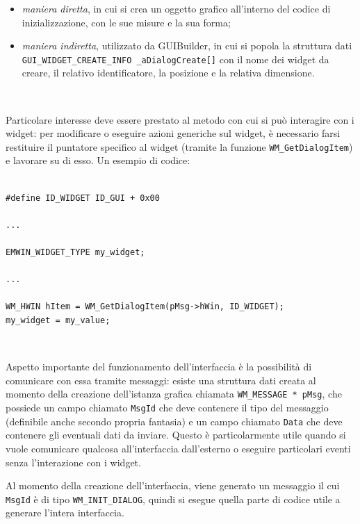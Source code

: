 \documentclass[a4paper,titlepage]{book}
\newcommand{\itema}{\begin{itemize}[noitemsep,topsep=10pt,parsep=5pt,partopsep=10pt]}
\newcommand{\code}{\lstinline}
\begin{document}
\itema

\item \textit{maniera diretta}, in cui si crea un oggetto grafico all'interno del codice di inizializzazione, con le sue misure e la sua forma;

\item \textit{maniera indiretta}, utilizzato da GUIBuilder, in cui si popola la struttura dati \code!GUI_WIDGET_CREATE_INFO _aDialogCreate[]! con il nome dei widget da creare, il relativo identificatore, la posizione e la relativa dimensione.

\end{itemize}

~

Particolare interesse deve essere prestato al metodo con cui si può interagire con i widget: per modificare o eseguire azioni generiche sul widget, è necessario farsi restituire il puntatore specifico al widget (tramite la funzione \code!WM_GetDialogItem!) e lavorare su di esso. Un esempio di codice:

\begin{lstlisting}

#define ID_WIDGET ID_GUI + 0x00

...

EMWIN_WIDGET_TYPE my_widget;

...

WM_HWIN hItem = WM_GetDialogItem(pMsg->hWin, ID_WIDGET);
my_widget = my_value; 

\end{lstlisting}

~

Aspetto importante del funzionamento dell'interfaccia è la possibilità di comunicare con essa tramite messaggi: esiste una struttura dati creata al momento della creazione dell'istanza grafica chiamata \code!WM_MESSAGE * pMsg!, che possiede un campo chiamato \code!MsgId! che deve contenere il tipo del messaggio (definibile anche secondo propria fantasia) e un campo chiamato \code!Data! che deve contenere gli eventuali dati da inviare. Questo è particolarmente utile quando si vuole comunicare qualcosa all'interfaccia dall'esterno o eseguire particolari eventi senza l'interazione con i widget.

Al momento della creazione dell'interfaccia, viene generato un messaggio il cui \code!MsgId! è di tipo \code!WM_INIT_DIALOG!, quindi si esegue quella parte di codice utile a generare l'intera interfaccia.

~
\end{document}
